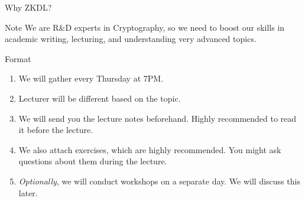 \documentclass{beamer}
\begin{document}
\begin{frame}{Why ZKDL?}
        \begin{alertblock}{Note}
          We are R\&D experts in Cryptography, so we need to boost our skills in academic writing, lecturing, and understanding very advanced topics.
        \end{alertblock}
    \end{frame}

    \begin{frame}{Format}
      \begin{enumerate}
        \item We will gather every Thursday at 7PM.
        \item Lecturer will be different based on the topic.
        \item We will send you the lecture notes beforehand. Highly recommended to read it before the lecture.
        \item We also attach exercises, which are highly recommended. You might ask questions about them during the lecture.
        \item \textit{Optionally}, we will conduct workshops on a separate day. We will discuss this later.
      \end{enumerate}
    \end{frame}
\end{document}
